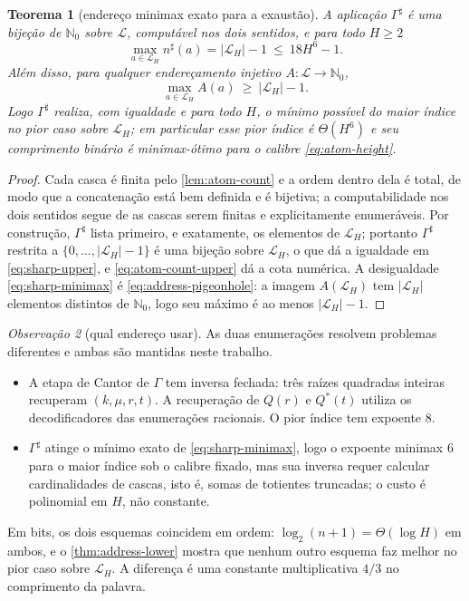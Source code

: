 \documentclass[11pt,a4paper]{article}
\newtheorem{theorem}{Teorema}[section]
\theoremstyle{definition}
\theoremstyle{remark}
\newtheorem{remark}[theorem]{Observação}
\newcommand{\Nzero}{\mathbb{N}_0}
\newcommand{\Library}{\mathcal{L}}
\begin{document}
\begin{theorem}[endereço minimax exato para a exaustão]\label{thm:sharp-optimal}
A aplicação $\Gamma^\sharp$ é uma bijeção de $\Nzero$ sobre $\Library$, computável nos dois sentidos, e para todo $H\ge2$
\begin{equation}
 \max_{a\in\Library_H}n^\sharp(a)=|\Library_H|-1\ \le\ 18H^6-1 .
 \label{eq:sharp-upper}
\end{equation}
Além disso, para \emph{qualquer} endereçamento injetivo $A:\Library\to\Nzero$,
\begin{equation}
 \max_{a\in\Library_H}A(a)\ \ge\ |\Library_H|-1 .
 \label{eq:sharp-minimax}
\end{equation}
Logo $\Gamma^\sharp$ realiza, com igualdade e para todo $H$, o mínimo possível
do maior índice no pior caso sobre $\Library_H$; em particular esse pior
índice é $\Theta(H^6)$ e seu comprimento binário é minimax-ótimo para o
calibre \eqref{eq:atom-height}.
\end{theorem}

\begin{proof}
Cada casca é finita pelo \cref{lem:atom-count} e a ordem dentro dela é total, de modo que a concatenação está bem definida e é bijetiva; a computabilidade nos dois sentidos segue de as cascas serem finitas e explicitamente enumeráveis. Por construção, $\Gamma^\sharp$ lista primeiro, e exatamente, os elementos de $\Library_H$; portanto $\Gamma^\sharp$ restrita a $\{0,\ldots,|\Library_H|-1\}$ é uma bijeção sobre $\Library_H$, o que dá a igualdade em \eqref{eq:sharp-upper}, e \eqref{eq:atom-count-upper} dá a cota numérica. A desigualdade \eqref{eq:sharp-minimax} é \eqref{eq:address-pigeonhole}: a imagem $A(\Library_H)$ tem $|\Library_H|$ elementos distintos de $\Nzero$, logo seu máximo é ao menos $|\Library_H|-1$.
\end{proof}

\begin{remark}[qual endereço usar]\label{rem:which-address}
As duas enumerações resolvem problemas diferentes e ambas são mantidas neste trabalho.
\begin{itemize}[leftmargin=1.6em]
 \item A etapa de Cantor de $\Gamma$ tem inversa fechada: três raízes quadradas inteiras recuperam $(k,\mu,r,t)$. A recuperação de $Q(r)$ e $Q^*(t)$ utiliza os decodificadores das enumerações racionais. O pior índice tem expoente $8$.
 \item $\Gamma^\sharp$ atinge o mínimo exato de \eqref{eq:sharp-minimax}, logo o expoente minimax $6$ para o maior índice sob o calibre fixado, mas sua inversa requer calcular cardinalidades de cascas, isto é, somas de totientes truncadas; o custo é polinomial em $H$, não constante.
\end{itemize}
Em bits, os dois esquemas coincidem em ordem: $\log_2(n+1)=\Theta(\log H)$ em ambos, e o \cref{thm:address-lower} mostra que nenhum outro esquema faz melhor no pior caso sobre $\Library_H$. A diferença é uma constante multiplicativa $4/3$ no comprimento da palavra.
\end{remark}
\end{document}
